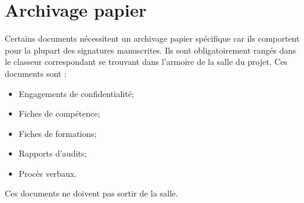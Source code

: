 \section{Archivage papier}
Certains documents nécessitent un archivage papier spécifique car ils comportent pour la plupart des signatures manuscrites. Ils sont obligatoirement rangés dans le classeur correspondant se trouvant dans l’armoire de la salle du projet. Ces documents sont :
\begin{itemize}
\item Engagements de confidentialité;
\item Fiches de compétence;
\item Fiches de formations;
\item Rapports d’audits;
\item Procès verbaux.
\end{itemize}
Ces documents ne doivent pas sortir de la salle.